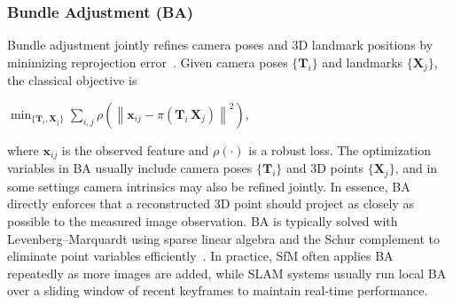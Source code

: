 \subsubsection{Bundle Adjustment (BA)}
Bundle adjustment jointly refines camera poses and 3D landmark positions by minimizing reprojection error~\cite{triggs2000bundle}. Given camera poses $\{\mathbf{T}_i\}$ and landmarks $\{\mathbf{X}_j\}$, the classical objective is
\begin{center}
    $\displaystyle \min_{\{\mathbf{T}_i,\mathbf{X}_j\}} \sum_{i,j} \rho\left(\left\| \mathbf{x}_{ij} - \pi(\mathbf{T}_i\,\mathbf{X}_j) \right\|^2\right), $
\end{center}
where $\mathbf{x}_{ij}$ is the observed feature and $\rho(\cdot)$ is a robust loss. The optimization variables in BA usually include camera poses $\{\mathbf{T}_i\}$ and 3D points $\{\mathbf{X}_j\}$, and in some settings camera intrinsics may also be refined jointly. In essence, BA directly enforces that a reconstructed 3D point should project as closely as possible to the measured image observation. BA is typically solved with Levenberg--Marquardt using sparse linear algebra and the Schur complement to eliminate point variables efficiently~\cite{triggs2000bundle,agarwal2010bundle}. In practice, SfM often applies BA repeatedly as more images are added, while SLAM systems usually run local BA over a sliding window of recent keyframes to maintain real-time performance.

